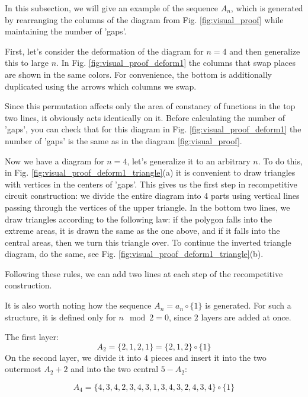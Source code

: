 \documentclass[a4paper, openany, 12pt]{article}
\theoremstyle{remark}
\theoremstyle{definition}
\begin{document}
In this subsection, we will give an example of the sequence $A_n$, which is generated by rearranging the columns of the diagram from Fig. \ref{fig:visual_proof} while maintaining the number of 'gaps'.

First, let's consider the deformation of the diagram for $n=4$ and then generalize this to large $n$.
In Fig. \ref{fig:visual_proof_deform1} the columns that swap places are shown in the same colors. For convenience, the bottom is additionally duplicated using the arrows which columns we swap.

Since this permutation affects only the area of constancy of functions in the top two lines, it obviously acts identically on it. Before calculating the number of 'gaps', you can check that for this diagram in Fig. \ref{fig:visual_proof_deform1} the number of 'gaps' is the same as in the diagram \ref{fig:visual_proof}.

Now we have a diagram for $n=4$, let's generalize it to an arbitrary $n$. To do this, in Fig. \ref{fig:visual_proof_deform1_triangle}(a) it is convenient to draw triangles with vertices in the centers of 'gaps'. This gives us the first step in recompetitive circuit construction: we divide the entire diagram into 4 parts using vertical lines passing through the vertices of the upper triangle. In the bottom two lines, we draw triangles according to the following law: if the polygon falls into the extreme areas, it is drawn the same as the one above, and if it falls into the central areas, then we turn this triangle over. To continue the inverted triangle diagram, do the same, see Fig. \ref{fig:visual_proof_deform1_triangle}(b).

Following these rules, we can add two lines at each step of the recompetitive construction.

It is also worth noting how the sequence $A_n = a_n\circ\{1\}$ is generated. For such a structure, it is defined only for $n\mod2= 0$, since $2$ layers are added at once.

The first layer:
\begin{equation}
    A_2 = \{2,1,2,1\} = \{2,1,2\}\circ\{1\}
\end{equation}
On the second layer, we divide it into $4$ pieces and insert it into the two outermost $A_2+2$ and into the two central $5-A_2$:

\begin{equation}
    A_4 = \{4,3,4,2,3,4,3,1,3,4,3,2,4,3,4\}\circ\{1\}
\end{equation}
\end{document}

